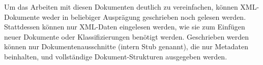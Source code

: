 Um das Arbeiten mit diesen Dokumenten deutlich zu vereinfachen, können XML-Dokumente
weder in beliebiger Ausprägung geschrieben noch gelesen werden. Stattdessen können
nur XML-Daten eingelesen werden, wie sie zum Einfügen neuer Dokumente
oder Klassifizierungen benötigt werden.
Geschrieben werden können nur Dokumentenausschnitte (intern Stub genannt),
die nur Metadaten beinhalten, und vollständige Dokument-Strukturen ausgegeben werden.